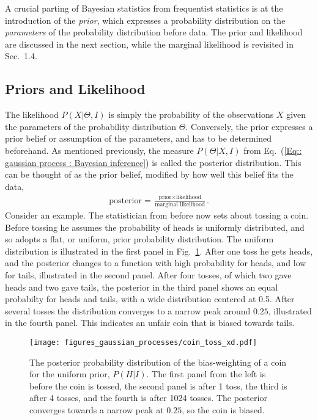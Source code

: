 \documentclass[twoside,english]{uiofysmaster}
\begin{document}
A crucial parting of Bayesian statistics from frequentist statistics is at the introduction of the \textit{prior}, which expresses a probability distribution on the \textit{parameters} of the probability distribution before data. The prior and likelihood are discussed in the next section, while the marginal likelihood is revisited in Sec.~1.4.

\subsection{Priors and Likelihood}\label{Sec:: gaussian process : Priors and Likelihood}

The likelihood $P(X |\Theta, I)$ is simply the probability of the observations $X$ given the parameters of the probability distribution $\Theta$. Conversely, the prior expresses a prior belief or assumption of the parameters, and has to be determined beforehand. As mentioned previously, the measure $P(\Theta | X , I)$ from Eq.~(\ref{Eq:: gaussian process : Bayesian inference}) is called the posterior distribution. This can be thought of as the prior belief, modified by how well this belief fits the data,
\begin{align*}
\text{posterior} = \frac{\text{prior} \times \text{likelihood}}{\text{marginal likelihood}}.
\end{align*}
Consider an example. The statistician from before now sets about tossing a coin. Before tossing he assumes the probability of heads is uniformly distributed, and so adopts a flat, or uniform, prior probability distribution. The uniform distribution is illustrated in the first panel in Fig.~\ref{Fig:: gaussian process : Dice throw }. After one toss he gets heads, and the posterior changes to a function with high probability for heads, and low for tails, illustrated in the second panel. After four tosses, of which two gave heads and two gave tails, the posterior in the third panel shows an equal probabilty for heads and tails, with a wide distribution centered at 0.5. After several tosses the distribution converges to a narrow peak around $0.25$, illustrated in the fourth panel. This indicates an unfair coin that is biased towards tails.

\begin{figure}
\texttt{[image: figures\_gaussian\_processes/coin\_toss\_xd.pdf]}
\caption{The posterior probability distribution of the bias-weighting of a coin for the uniform prior, $P(H|I)$. The first panel from the left is before the coin is tossed, the second panel is after 1 toss, the third is after 4 tosses, and the fourth is after 1024 tosses. The posterior converges towards a narrow peak at $0.25$, so the coin is biased.}
\label{Fig:: gaussian process : Dice throw }
\end{figure}
\end{document}
